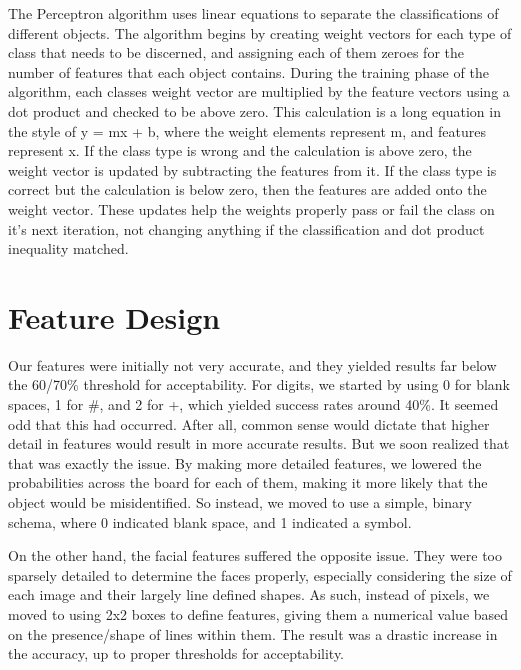 \documentclass{article}
\begin{document}
The Perceptron algorithm uses linear equations to separate the classifications of different objects. The algorithm begins by creating weight vectors for each type of class that needs to be discerned, and assigning each of them zeroes for the number of features that each object contains. During the training phase of the algorithm, each classes weight vector are multiplied by the feature vectors using a dot product and checked to be above zero. This calculation is a long equation in the style of y = mx + b, where the weight elements represent m, and features represent x. If the class type is wrong and the calculation is above zero, the weight vector is updated by subtracting the features from it. If the class type is correct but the calculation is below zero, then the features are added onto the weight vector. These updates help the weights properly pass or fail the class on it's next iteration, not changing anything if the classification and dot product inequality matched. 
\section{Feature Design}
Our features were initially not very accurate, and they yielded results far below the 60/70\% threshold for acceptability. For digits, we started by using 0 for blank spaces, 1 for \#, and 2 for +, which yielded success rates around 40\%. It seemed odd that this had occurred. After all, common sense would dictate that higher detail in features would result in more accurate results. But we soon realized that that was exactly the issue. By making more detailed features, we lowered the probabilities across the board for each of them, making it more likely that the object would be misidentified. So instead, we moved to use a simple, binary schema, where 0 indicated blank space, and 1 indicated a symbol.
\par
On the other hand, the facial features suffered the opposite issue. They were too sparsely detailed to determine the faces properly, especially considering the size of each image and their largely line defined shapes. As such, instead of pixels, we moved to using 2x2 boxes to define features, giving them a numerical value based on the presence/shape of lines within them. The result was a drastic increase in the accuracy, up to proper thresholds for acceptability.
\end{document}
